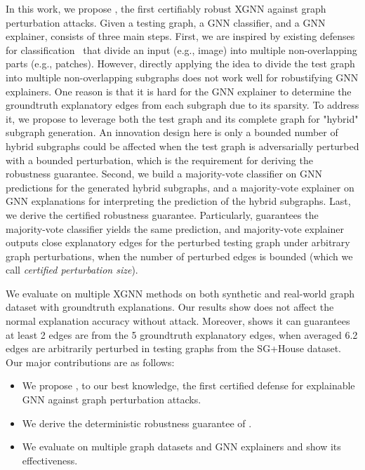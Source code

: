 In this work, we propose {\name}, the first {certifiably robust} XGNN against graph perturbation attacks. Given a testing graph, a GNN classifier, and 
 a GNN explainer,
{\name} consists of three main steps. First, we are inspired by 
existing defenses for  classification~\citep{levine2020randomized, jia2021intrinsic,jia2022certified,xia2024gnncert,yang2024distributed,li2025agnncert} that divide an input (e.g., image) into multiple non-overlapping parts (e.g., patches). 
However, directly applying the idea to divide the test graph into multiple non-overlapping subgraphs does not work well for robustifying GNN explainers. 
One reason is that it is hard for the GNN explainer to determine the groundtruth explanatory edges from each subgraph due to its sparsity. 
To address it, we propose to leverage both the test graph and its complete graph for "hybrid" subgraph generation. An innovation design here is only a bounded number of hybrid subgraphs could be affected when the 
test graph is adversarially perturbed with a bounded perturbation, which is the requirement for deriving the robustness guarantee.  
Second, we build a majority-vote classifier on GNN predictions for the generated hybrid subgraphs,  
and a majority-vote explainer on GNN explanations for interpreting 
the prediction 
of the hybrid subgraphs. 
Last, we derive the certified robustness guarantee. 
Particularly, {\name} guarantees the majority-vote classifier yields the same prediction, and majority-vote explainer outputs close explanatory edges for the perturbed testing graph under arbitrary graph perturbations, when the number of perturbed edges is bounded (which we call \emph{certified perturbation size}). 

We evaluate {\name} on multiple XGNN methods on both synthetic and real-world graph dataset with groundtruth explanations. 
Our results show {\name} does not affect the normal explanation accuracy without attack. Moreover, {\name} shows it can guarantees at least 2
edges are from the 5 groundtruth explanatory edges, when averaged 6.2 edges are arbitrarily perturbed in testing graphs from the SG+House dataset.  
Our major contributions are as follows:
\begin{itemize}[leftmargin=*]
\vspace{-2mm}
    \item We propose {\name}, to our best knowledge, the first certified defense for explainable GNN  against graph perturbation attacks. 
    \item We derive the deterministic robustness guarantee of {\name}. 
    \item We evaluate {\name} on multiple graph datasets and GNN explainers and show its effectiveness.  
\end{itemize}

